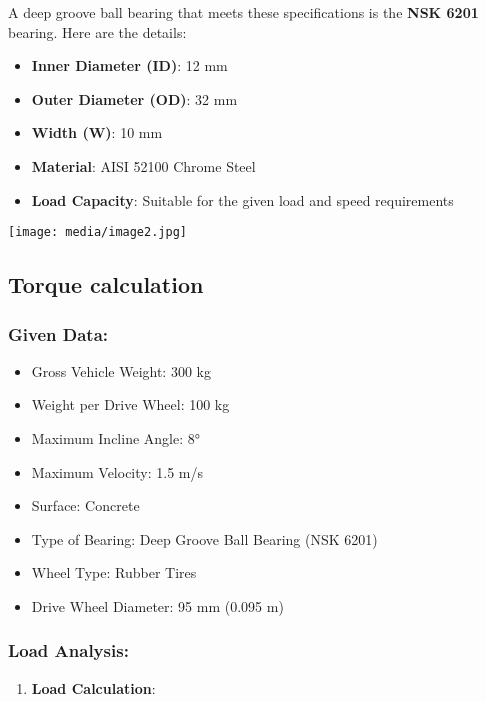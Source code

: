 \documentclass[../../main]{subfiles}
\begin{document}
A deep groove ball bearing that meets these specifications is the
\textbf{NSK 6201} bearing. Here are the details:

\begin{itemize}
\item
  \textbf{Inner Diameter (ID)}: 12 mm
\item
  \textbf{Outer Diameter (OD)}: 32 mm
\item
  \textbf{Width (W)}: 10 mm
\item
  \textbf{Material}: AISI 52100 Chrome Steel
\item
  \textbf{Load Capacity}: Suitable for the given load and speed
  requirements
\end{itemize}

\texttt{[image: media/image2.jpg]}

\subsection{Torque calculation}\label{torque-calculation}

\subsubsection{\texorpdfstring{\textbf{Given
Data:}}{Given Data:}}\label{given-data}

\begin{itemize}
\item
  Gross Vehicle Weight: 300 kg
\item
  Weight per Drive Wheel: 100 kg
\item
  Maximum Incline Angle: 8°
\item
  Maximum Velocity: 1.5 m/s
\item
  Surface: Concrete
\item
  Type of Bearing: Deep Groove Ball Bearing (NSK 6201)
\item
  Wheel Type: Rubber Tires
\item
  Drive Wheel Diameter: 95 mm (0.095 m)
\end{itemize}

\subsubsection{\texorpdfstring{\textbf{Load
Analysis:}}{Load Analysis:}}\label{load-analysis}

\begin{enumerate}
\def\labelenumi{\arabic{enumi}.}
\item
  \textbf{Load Calculation}:
\end{enumerate}
\end{document}
